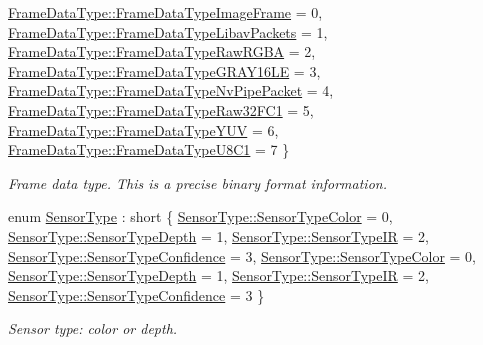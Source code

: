 \begin{DoxyCompactItemize}
\newline
\hyperlink{namespacemoetsi_1_1ssp_aa9b059f0bc7a91855545ee887f2d56c4a6f466822a5d24eab84554c0bf415903d}{Frame\+Data\+Type\+::\+Frame\+Data\+Type\+Image\+Frame} = 0, 
\hyperlink{namespacemoetsi_1_1ssp_aa9b059f0bc7a91855545ee887f2d56c4a234b11a09d69865a40eb4db132fe7096}{Frame\+Data\+Type\+::\+Frame\+Data\+Type\+Libav\+Packets} = 1, 
\hyperlink{namespacemoetsi_1_1ssp_aa9b059f0bc7a91855545ee887f2d56c4ac2cdf85544553bda5453b401b79964eb}{Frame\+Data\+Type\+::\+Frame\+Data\+Type\+Raw\+R\+G\+BA} = 2, 
\hyperlink{namespacemoetsi_1_1ssp_aa9b059f0bc7a91855545ee887f2d56c4a44d909233498ad3dec5a3e3e95e908ca}{Frame\+Data\+Type\+::\+Frame\+Data\+Type\+G\+R\+A\+Y16\+LE} = 3, 
\newline
\hyperlink{namespacemoetsi_1_1ssp_aa9b059f0bc7a91855545ee887f2d56c4a1628ff13722acd71d3e90b51c8faa31c}{Frame\+Data\+Type\+::\+Frame\+Data\+Type\+Nv\+Pipe\+Packet} = 4, 
\hyperlink{namespacemoetsi_1_1ssp_aa9b059f0bc7a91855545ee887f2d56c4abb6735708adc6efcecf59e0e1e6c9387}{Frame\+Data\+Type\+::\+Frame\+Data\+Type\+Raw32\+F\+C1} = 5, 
\hyperlink{namespacemoetsi_1_1ssp_aa9b059f0bc7a91855545ee887f2d56c4a6191c61c70f47aa00e2f9251d8ad59fa}{Frame\+Data\+Type\+::\+Frame\+Data\+Type\+Y\+UV} = 6, 
\hyperlink{namespacemoetsi_1_1ssp_aa9b059f0bc7a91855545ee887f2d56c4acd5fc2d48d13ef44a9806046ae34d56b}{Frame\+Data\+Type\+::\+Frame\+Data\+Type\+U8\+C1} = 7
 \}\begin{DoxyCompactList}\small\item\em Frame data type. This is a precise binary format information. \end{DoxyCompactList}
\item 
enum \hyperlink{namespacemoetsi_1_1ssp_abd5a57e44ab71b73d2e32a59887474de}{Sensor\+Type} \+: short \{ \newline
\hyperlink{namespacemoetsi_1_1ssp_abd5a57e44ab71b73d2e32a59887474dea896d4c904dda3d40337f16257ad819c9}{Sensor\+Type\+::\+Sensor\+Type\+Color} = 0, 
\hyperlink{namespacemoetsi_1_1ssp_abd5a57e44ab71b73d2e32a59887474dea38c56a32340ea03dd83b817cdbc15dd9}{Sensor\+Type\+::\+Sensor\+Type\+Depth} = 1, 
\hyperlink{namespacemoetsi_1_1ssp_abd5a57e44ab71b73d2e32a59887474dea06604c7f56c3ee7bcc422afac6239543}{Sensor\+Type\+::\+Sensor\+Type\+IR} = 2, 
\hyperlink{namespacemoetsi_1_1ssp_abd5a57e44ab71b73d2e32a59887474dea8fc6ffe5307d7e91425ea4a160a45fa2}{Sensor\+Type\+::\+Sensor\+Type\+Confidence} = 3, 
\newline
\hyperlink{namespacemoetsi_1_1ssp_abd5a57e44ab71b73d2e32a59887474dea896d4c904dda3d40337f16257ad819c9}{Sensor\+Type\+::\+Sensor\+Type\+Color} = 0, 
\hyperlink{namespacemoetsi_1_1ssp_abd5a57e44ab71b73d2e32a59887474dea38c56a32340ea03dd83b817cdbc15dd9}{Sensor\+Type\+::\+Sensor\+Type\+Depth} = 1, 
\hyperlink{namespacemoetsi_1_1ssp_abd5a57e44ab71b73d2e32a59887474dea06604c7f56c3ee7bcc422afac6239543}{Sensor\+Type\+::\+Sensor\+Type\+IR} = 2, 
\hyperlink{namespacemoetsi_1_1ssp_abd5a57e44ab71b73d2e32a59887474dea8fc6ffe5307d7e91425ea4a160a45fa2}{Sensor\+Type\+::\+Sensor\+Type\+Confidence} = 3
 \}\begin{DoxyCompactList}\small\item\em Sensor type\+: color or depth. \end{DoxyCompactList}
\end{DoxyCompactItemize}
